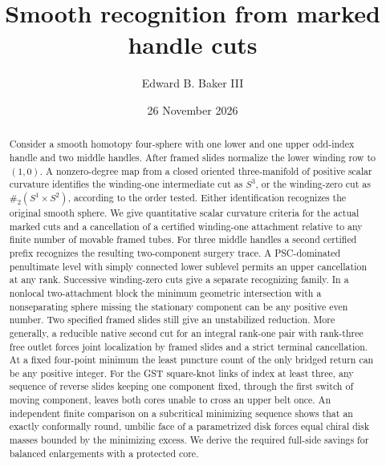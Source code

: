 \documentclass[11pt,letterpaper]{article}
\title{Smooth recognition from marked handle cuts}
\author{Edward B. Baker III}
\date{26 November 2026}
\numberwithin{equation}{section}
\theoremstyle{remark}
\begin{document}
\maketitle

\begin{abstract}
Consider a smooth homotopy four-sphere with one lower and one upper
odd-index handle and two middle handles. After framed slides normalize
the lower winding row to \((1,0)\). A nonzero-degree map from a closed
oriented three-manifold of positive scalar curvature identifies the
winding-one intermediate cut as \(S^3\), or the winding-zero cut as
\(\#_2(S^1\times S^2)\), according to the order tested. Either
identification recognizes the original smooth sphere. We give
quantitative scalar curvature criteria for the actual marked cuts and
a cancellation of a certified winding-one attachment relative to any
finite number of movable framed tubes. For three middle handles a
second certified prefix recognizes the resulting two-component
surgery trace. A PSC-dominated penultimate level with simply connected
lower sublevel permits an upper cancellation at any rank. Successive
winding-zero cuts give a separate recognizing family. In a nonlocal
two-attachment block the minimum geometric intersection with a
nonseparating sphere missing the stationary component can be any
positive even number. Two specified framed slides still give an
unstabilized reduction. More generally, a reducible native second cut
for an integral rank-one pair with rank-three free outlet forces joint
localization by framed slides and a strict terminal cancellation. At a
fixed four-point minimum the least puncture count of the only bridged
return can be any positive integer. For the GST square-knot links of index at least three,
any sequence of reverse slides keeping one component fixed, through the first
switch of moving component, leaves both cores unable to cross an upper belt once.
An independent finite comparison on a subcritical
minimizing sequence shows that an exactly conformally round, umbilic
face of a parametrized disk forces equal chiral disk masses bounded by
the minimizing excess. We derive the required full-side savings for
balanced enlargements with a protected core.
\end{abstract}
\end{document}
